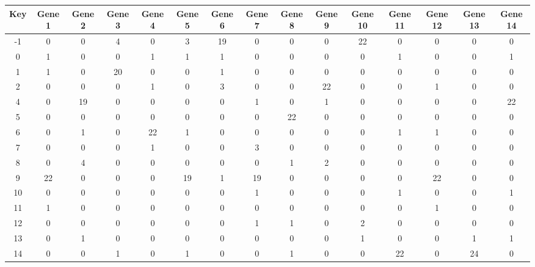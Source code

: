 \begin{tabular}{|c|c|c|c|c|c|c|c|c|c|c|c|c|c|c|}
\hline
Key & Gene 1 & Gene 2 & Gene 3 & Gene 4 & Gene 5 & Gene 6 & Gene 7 & Gene 8 & Gene 9 & Gene 10 & Gene 11 & Gene 12 & Gene 13 & Gene 14 \\
\hline
-1 & 0 & 0 & 4 & 0 & 3 & 19 & 0 & 0 & 0 & 22 & 0 & 0 & 0 & 0 \\
0 & 1 & 0 & 0 & 1 & 1 & 1 & 0 & 0 & 0 & 0 & 1 & 0 & 0 & 1 \\
1 & 1 & 0 & 20 & 0 & 0 & 1 & 0 & 0 & 0 & 0 & 0 & 0 & 0 & 0 \\
2 & 0 & 0 & 0 & 1 & 0 & 3 & 0 & 0 & 22 & 0 & 0 & 1 & 0 & 0 \\
4 & 0 & 19 & 0 & 0 & 0 & 0 & 1 & 0 & 1 & 0 & 0 & 0 & 0 & 22 \\
5 & 0 & 0 & 0 & 0 & 0 & 0 & 0 & 22 & 0 & 0 & 0 & 0 & 0 & 0 \\
6 & 0 & 1 & 0 & 22 & 1 & 0 & 0 & 0 & 0 & 0 & 1 & 1 & 0 & 0 \\
7 & 0 & 0 & 0 & 1 & 0 & 0 & 3 & 0 & 0 & 0 & 0 & 0 & 0 & 0 \\
8 & 0 & 4 & 0 & 0 & 0 & 0 & 0 & 1 & 2 & 0 & 0 & 0 & 0 & 0 \\
9 & 22 & 0 & 0 & 0 & 19 & 1 & 19 & 0 & 0 & 0 & 0 & 22 & 0 & 0 \\
10 & 0 & 0 & 0 & 0 & 0 & 0 & 1 & 0 & 0 & 0 & 1 & 0 & 0 & 1 \\
11 & 1 & 0 & 0 & 0 & 0 & 0 & 0 & 0 & 0 & 0 & 0 & 1 & 0 & 0 \\
12 & 0 & 0 & 0 & 0 & 0 & 0 & 1 & 1 & 0 & 2 & 0 & 0 & 0 & 0 \\
13 & 0 & 1 & 0 & 0 & 0 & 0 & 0 & 0 & 0 & 1 & 0 & 0 & 1 & 1 \\
14 & 0 & 0 & 1 & 0 & 1 & 0 & 0 & 1 & 0 & 0 & 22 & 0 & 24 & 0 \\
\hline
\end{tabular}